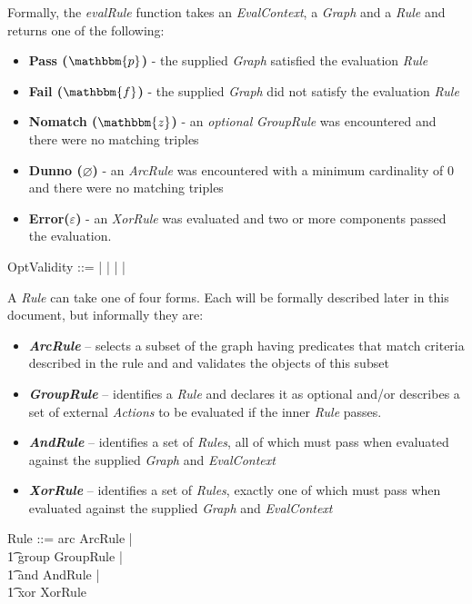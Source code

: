 \documentclass[fuzz]{llncs}
\def\pass{{\mathbbm{p}}}
\def\fail{{\mathbbm{f}}}
\def\dunno{\varnothing}
\def\error{\varepsilon}
\def\nomatch{\mathbbm{z}}
\def\zc{\textit}
\begin{document}
Formally, the \zc{evalRule} function takes an \zc{EvalContext}, a \zc{Graph} and a \zc{Rule} and returns one of the following:
\begin{itemize}
\item \textbf{Pass ($\pass$)} - the supplied \zc{Graph} satisfied the evaluation \zc{Rule}
\item \textbf{Fail ($\fail$)} - the supplied \zc{Graph} did not satisfy the evaluation \zc{Rule}
\item \textbf{Nomatch ($\nomatch$)} - an \zc{optional} \zc{GroupRule} was encountered and there were no matching triples
\item \textbf{Dunno ($\dunno$)} - an \zc{ArcRule} was encountered with a minimum cardinality of 0 and there were no matching triples
\item \textbf{Error($\error$)} - an \zc{XorRule} was evaluated and two or more components passed the evaluation.
\end{itemize}
\begin{zed}
OptValidity ::= \pass | \fail | \nomatch | \dunno | \error \\
\end{zed}
A  \zc{Rule} can take one of four forms. Each will be formally described later in this
document, but informally they are:
\begin{itemize}
\item \textbf{\zc{ArcRule}} -- selects a subset of the graph having predicates that match
criteria described in the rule and
and validates the objects of this subset
\item \textbf{\zc{GroupRule}} -- identifies a \zc{Rule} and declares it as optional and/or
describes a set of external \zc{Actions} to be evaluated if the inner \zc{Rule} passes.
\item \textbf{\zc{AndRule}} -- identifies a set of \zc{Rules}, all of which must pass when
evaluated against the supplied \zc{Graph} and \zc{EvalContext}
\item \textbf{\zc{XorRule}} -- identifies a set of \zc{Rules}, exactly one of which must pass when
evaluated against the supplied \zc{Graph} and \zc{EvalContext}
\end{itemize}
\begin{zed}
Rule ::= arc \ldata ArcRule \rdata | \\
\t1 group \ldata GroupRule \rdata | \\
\t1 and \ldata AndRule \rdata | \\
\t1 xor \ldata XorRule \rdata \\
\end{zed}
\end{document}
